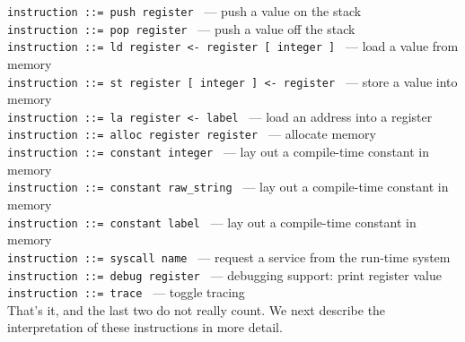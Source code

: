 \documentclass[]{article}
\begin{document}
\texttt{instruction ::= push register } --- push a value on the stack\\
\texttt{instruction ::= pop register } --- push a value off the stack\\
\texttt{instruction ::= ld register \textless{}- register {[} integer {]} }
--- load a value from memory \\
\texttt{instruction ::= st register {[} integer {]} \textless{}- register }
--- store a value into memory \\
\texttt{instruction ::= la register \textless{}- label } --- load an
address into a register \\

\texttt{instruction ::= alloc register register } --- allocate memory\\
\texttt{instruction ::= constant integer } --- lay out a compile-time
constant in memory\\ \texttt{instruction ::= constant raw\_string } ---
lay out a compile-time constant in memory\\
\texttt{instruction ::= constant label } --- lay out a compile-time
constant in memory\\

\texttt{instruction ::= syscall name } --- request a service from the
run-time system\\

\texttt{instruction ::= debug register } --- debugging support: print
register value \\ \texttt{instruction ::= trace } --- toggle tracing \\

That's it, and the last two do not really count. We next describe the
interpretation of these instructions in more detail.
\end{document}
